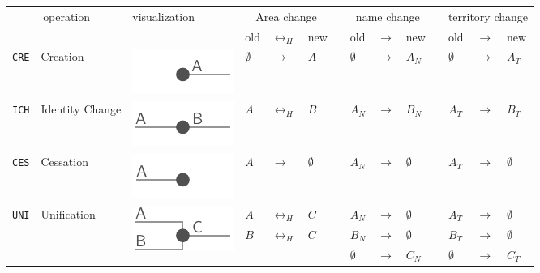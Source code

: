 \begin{table}[!h]
\begin{center}
\begin{tabular}{m{0.65cm} m{2.5cm} m{2.2cm}
                m{0.35cm} m{0.35cm} m{0.35cm} m{0.01cm}
                m{0.35cm} m{0.3cm} m{0.35cm} m{0.01cm}
                m{0.35cm} m{0.3cm} m{0.88cm}}
  \toprule
    \multicolumn{2}{c}{operation}
  & visualization
  & \multicolumn{3}{c}{Area change} &
  & \multicolumn{3}{c}{name change} &
  & \multicolumn{3}{c}{territory change} \\
  & & &
  old & $ \leftrightarrow_H $ & new & &
  old & $ \rightarrow $ & new & &
  old & $ \rightarrow $ & new \\

  \midrule[0.07em]
  \texttt{CRE} & Creation & \includegraphics{graphics/concept/operations/CRE} &
  $ \emptyset $ & $ \rightarrow $ & $ A $ & &
  $ \emptyset $ & $ \rightarrow $ & $ A_N $ & &
  $ \emptyset $ & $ \rightarrow $ & $ A_T $ \\

  \midrule[0.01em]
  \texttt{ICH} & Identity Change & \includegraphics{graphics/concept/operations/ICH} &
  $ A   $ & $ \leftrightarrow_H $ & $ B $ & &
  $ A_N $ & $ \rightarrow $       & $ B_N $ & &
  $ A_T $ & $ \rightarrow $       & $ B_T $ \\

  \midrule[0.01em]
  \texttt{CES} & Cessation & \includegraphics{graphics/concept/operations/CES} &
  $ A $   & $ \rightarrow $       & $ \emptyset $ & &
  $ A_N $ & $ \rightarrow $       & $ \emptyset $ & &
  $ A_T $ & $ \rightarrow $       & $ \emptyset $ \\

  \midrule[0.07em]
  \multirow{3}{*}{\texttt{UNI}} &
  \multirow{3}{*}{Unification} &
  \multirow{3}{*}{\includegraphics{graphics/concept/operations/UNI}} &
  $ A $   & $ \leftrightarrow_H $ & $ C $ & &
  $ A_N $ & $ \rightarrow $       & $ \emptyset $ & &
  $ A_T $ & $ \rightarrow $       & $ \emptyset $ \\
  & & &
  $ B $   & $ \leftrightarrow_H $ & $ C $ & &
  $ B_N $ & $ \rightarrow $       & $ \emptyset $ & &
  $ B_T $ & $ \rightarrow $       & $ \emptyset $ \\
  & & &
  & & & &
  $ \emptyset $ & $ \rightarrow $ & $ C_N $ & &
  $ \emptyset $ & $ \rightarrow $ & $ C_T $ \footnotemark \\


\end{tabular}
\end{center}
\end{table}
